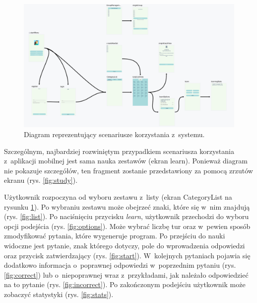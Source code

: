 \documentclass[a4paper,twoside,12pt]{book}
\begin{document}
\begin{figure}[]
\centering
\includegraphics[width=\textwidth]{Navgraph}
\caption{Diagram reprezentujący scenariusze korzystania z~systemu.}
\label{fig:navgraph}
\end{figure}

Szczególnym, najbardziej rozwiniętym przypadkiem scenariusza korzystania z~aplikacji mobilnej jest sama nauka zestawów (ekran learn). Ponieważ diagram nie pokazuje szczegółów, ten fragment zostanie przedstawiony za pomocą zrzutów ekranu (rys. \ref{fig:study}). 

Użytkownik rozpoczyna od wyboru zestawu z~listy (ekran CategoryList na rysunku \ref{fig:navgraph}). Po wybraniu zestawu może obejrzeć znaki, które się w~nim znajdują (rys. \ref{fig:list}). Po naciśnięciu przycisku \textit{learn}, użytkownik przechodzi do wyboru opcji podejścia (rys. \ref{fig:options}). Może wybrać liczbę tur oraz w~pewien sposób zmodyfikować pytania, które wygeneruje program.  Po przejściu do nauki widoczne jest pytanie, znak którego dotyczy, pole do wprowadzenia odpowiedzi oraz przycisk zatwierdzający (rys. \ref{fig:start}). W~kolejnych pytaniach pojawia się dodatkowo informacja o~poprawnej odpowiedzi w~poprzednim pytaniu (rys. \ref{fig:correct}) lub o~niepoprawnej wraz z~przykładami, jak należało odpowiedzieć na to pytanie (rys. \ref{fig:incorrect}). Po zakończonym podejściu użytkownik może zobaczyć statystyki (rys. \ref{fig:stats}).


\end{document}
